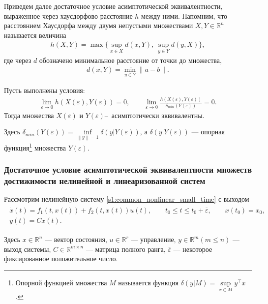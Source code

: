 \documentclass[../main.tex]{subfiles}
\begin{document}
Приведем далее достаточное условие асимптотической эквивалентности, выраженное через хаусдорфово расстояние $ h $ между ними. 
Напомним, что расстоянием Хаусдорфа между двумя непустыми множествами $X, Y \in \mathbb{R}^n$ называется величина 
\begin{gather*}
	h(X,Y) = \max\Big\{ \sup\limits_{x \in X} d(x, Y), \ \sup\limits_{y \in Y} d(y, X) \Big\},
\end{gather*}
где через $d$ обозначено минимальное расстояние от точки до множества, 
\begin{gather*}
	d(x, Y) = \min\limits_{y \in Y} \| a - b\|.
\end{gather*} 
\begin{theorem}\label{suff}\cite{GusevUMJ}
 Пусть выполнены условия:
 \begin{gather*}
 \lim\limits_{\varepsilon \rightarrow 0}h(X(\varepsilon),Y(\varepsilon)) = 0, \qquad \lim\limits_{\varepsilon \rightarrow 0}\frac{h(X(\varepsilon),Y(\varepsilon))}{\delta_{min}(Y(\varepsilon))} = 0.
 \end{gather*}
 Тогда множества $ X(\varepsilon) $ и $ Y(\varepsilon) $\---~асимптотически эквивалентны. 
 
 Здесь $ \delta_{min}(Y(\varepsilon)) = \inf\limits_{\left\|y \right\| =1 } \delta(y|Y(\varepsilon))$, а $ \delta(y|Y(\varepsilon)) $ --- опорная функция\footnote{
 Опорной функцией множества $M$ называется функция $\delta(y|M) = \sup\limits_{x \in M} y^{\top} x$. 
 } множества $ Y(\varepsilon) $.
\end{theorem}
\subsubsection{Достаточное условие асимптотической эквивалентности множеств достижимости нелинейной и линеаризованной систем}
 Рассмотрим нелинейную систему \eqref{s1:common_nonlinear_small_time} с выходом
\begin{gather}\label{s2:nonlinear_with_output}
 \begin{gathered}
 \dot{x}(t)=f_1(t,x(t))+f_2(t,x(t))u(t), \qquad t_0 \leqslant t \leqslant t_0 + \overline{\varepsilon}, \qquad x(t_0) = x_0, \\
 y(t) = C x(t).
 \end{gathered}
\end{gather}

Здесь $ x \in \mathbb{R}^n $ --- вектор состояния, $ u \in \mathbb{R}^r $ --- управление, $ y\in\mathbb{R}^m (m \leqslant n) $ --- выход системы,
$ C\in \mathbb{R}^{m \times n} $ --- матрица полного ранга, $ \bar{\varepsilon} $ --- некоторое фиксированное положительное число.
\end{document}
